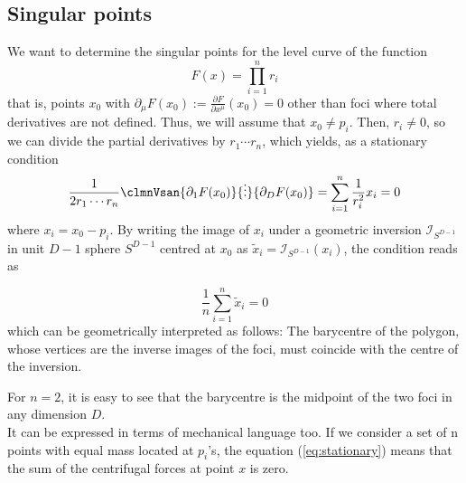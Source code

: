 \documentclass{article}
\begin{document}
\subsection{Singular points}
\label{sec:orgb17a626}
We want to determine the singular points for the level curve of the function
\begin{equation}
\label{ }
F(x) =  \prod_{i=1}^{n} r_i 
\end{equation}
that is, points \(x_0\) with \(\partial_{\mu} F(x_0) := \frac{\partial F}{\partial x^{\mu}}(x_0)= 0\) other than foci where total derivatives are not defined. Thus, we will assume that \(x_0 \ne p_i\). Then, \(r_i \ne 0\), so we can divide the partial derivatives by \(r_1 \cdots r_n\), which yields, as a stationary condition
\begin{equation}
\label{eq:stationary}
\frac{1}{2r_1 \cdots r_n}\clmnVsan{\partial_1 F(x_0)}{\vdots}{\partial_D F(x_0)} = \sum_{i=1}^{n} \frac{1}{r_i^2} x_i =0
\end{equation}
where \(x_i = x_0-p_i\). By writing the image of \(x_i\) under a geometric inversion \(\mathcal{I}_{S^{D-1}}\) in unit \(D-1\) sphere \(S^{D-1}\) centred at \(x_0\) as \(\tilde{x}_i = \mathcal{I}_{S^{D-1}}(x_i)\), the condition reads as

\begin{equation}
\label{ }
\frac{1}{n}\sum_{i=1}^{n} \tilde{x}_i =0
\end{equation}
which can be geometrically interpreted as follows: The barycentre of the polygon, whose vertices are the inverse images of the foci, must coincide with the centre of the inversion.

For \(n=2\), it is easy to see that the barycentre is the midpoint of the two foci in any dimension \(D\).\\
It can be expressed in terms of mechanical language too. If we consider a set of n points with equal mass located at \(p_i\)'s, the equation (\ref{eq:stationary}) means that the sum of the centrifugal forces at point \(x\) is zero.
\end{document}
